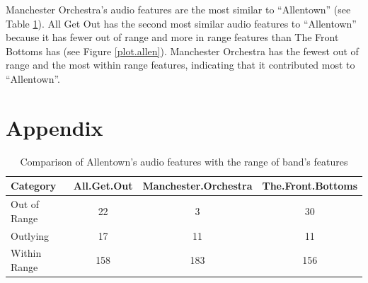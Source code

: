 \documentclass{article}\usepackage[]{graphicx}\usepackage[]{xcolor}
\begin{document}
\begin{multicols}{2}
Manchester Orchestra's audio features are the most similar to ``Allentown'' (see Table \ref{allentown.tab}). All Get Out has the second most similar audio features to ``Allentown'' because it has fewer out of range and more in range features than The Front Bottoms has (see Figure \ref{plot.allen}). Manchester Orchestra has the fewest out of range and the most within range features, indicating that it contributed most to ``Allentown''.

\vspace{2em}
\begin{tiny}

\end{tiny}
\end{multicols}

\newpage
\onecolumn
\section{Appendix}
\begin{table}[ht]
\centering
\begin{tabular}{|l|c|c|c|}
  \hline
Category & All.Get.Out & Manchester.Orchestra & The.Front.Bottoms \\ 
  \hline
Out of Range &  22 &   3 &  30 \\ 
  Outlying &  17 &  11 &  11 \\ 
  Within Range & 158 & 183 & 156 \\ 
   \hline
\end{tabular}
\caption{Comparison of Allentown's audio features with the range of band's features} 
\label{allentown.tab}
\end{table}
\end{document}
